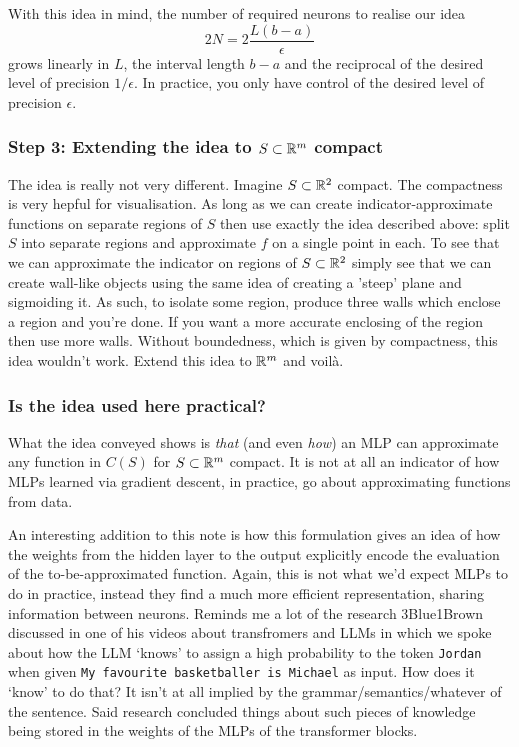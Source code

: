 \documentclass[11pt]{article}
\begin{document}
With this idea in mind, the number of required neurons to realise our idea
$$
2N
=
2\frac{L(b-a)}{\epsilon}
$$
grows linearly in $L$, the interval length $b-a$ and the reciprocal of the desired level of precision $1/\epsilon$. In practice, you only have control of the desired level of precision $\epsilon$.

\subsubsection*{Step 3: Extending the idea to $S\subset\mathbb{R}^m$ compact}
The idea is really not very different. Imagine $S\subset\mathbb{R}^2$ compact. The compactness is very hepful for visualisation. As long as we can create indicator-approximate functions on separate regions of $S$ then use exactly the idea described above: split $S$ into separate regions and approximate $f$ on a single point in each. To see that we can approximate the indicator on regions of $S\subset\mathbb{R}^2$ simply see that we can create wall-like objects using the same idea of creating a 'steep' plane and sigmoiding it. As such, to isolate some region, produce three walls which enclose a region and you're done. If you want a more accurate enclosing of the region then use more walls. Without boundedness, which is given by compactness, this idea wouldn't work. Extend this idea to $\mathbb{R}^m$ and voilà.


\subsubsection*{Is the idea used here practical?}
What the idea conveyed shows is \textit{that} (and even \textit{how}) an MLP can approximate any function in $C(S)$ for $S\subset\mathbb{R}^m$ compact. It is not at all an indicator of how MLPs learned via gradient descent, in practice, go about approximating functions from data.

An interesting addition to this note is how this formulation gives an idea of how the weights from the hidden layer to the output explicitly encode the evaluation of the to-be-approximated function. Again, this is not what we'd expect MLPs to do in practice, instead they find a much more efficient representation, sharing information between neurons. Reminds me a lot of the research 3Blue1Brown discussed in one of his videos about transfromers and LLMs in which we spoke about how the LLM `knows' to assign a high probability to the token \texttt{Jordan} when given \texttt{My favourite basketballer is Michael} as input. How does it `know' to do that? It isn't at all implied by the grammar/semantics/whatever of the sentence. Said research concluded things about such pieces of knowledge being stored in the weights of the MLPs of the transformer blocks.
\end{document}
